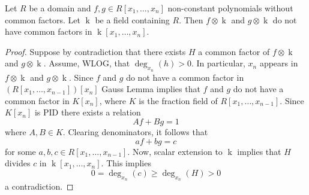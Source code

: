 \documentclass[10pt,a4paper]{amsart}
\DeclareMathOperator{\field}{k}
\begin{document}
\begin{prop}\label{ext} 
    Let $R$ be a domain and $f, g \in R[x_1,\ldots,x_n]$ non-constant polynomials without common factors. Let $\field$ be a field containing $R$. Then $f\otimes \field$ and $g\otimes \field$ do not have common factors in $\field[x_1,\ldots,x_n]$. 
\end{prop}

\begin{proof} 
    Suppose by contradiction that there exists $H$ a common factor of $f\otimes \field$ and $g\otimes \field$. Assume, WLOG, that $\deg_{x_{n}}(h)>0$. In particular, $x_n$ appears in $f\otimes \field$ and $g\otimes \field$. Since $f$ and $g$ do not have a common factor in $(R[x_1,\ldots,x_{n-1}])[x_n]$ Gauss Lemma implies that $f$ and $g$ do not have a common factor in $K[x_n]$, where $K$ is the fraction field of $R[x_1,\ldots,x_{n-1}]$. Since $K[x_n]$ is PID there exists a relation
    $$
        Af+Bg = 1
    $$
    where $A,B \in K$. Clearing denominators, it follows that 
    $$
        af+bg = c
    $$
    for some $a,b,c \in R[x_1,\ldots,x_{n-1}]$. Now, scalar extension to $\field$ implies that $H$ divides $c$ in $\field[x_1,\ldots,x_n]$. This implies
    $$
        0 = \deg_{x_{n}}(c)\geq \deg_{x_n}(H)>0
    $$
    a contradiction.
\end{proof}
\end{document}
